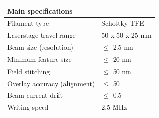 \documentclass{article}
\begin{document}

\begin{table}[]
\centering
    \begin{tabular}{|ll|}
    \hline
    \multicolumn{2}{|l|}{Main specifications}                            \\ \hline
    \multicolumn{1}{|l|}{Filament type}                & Schottky-TFE    \\ \hline
    \multicolumn{1}{|l|}{Laserstage travel range}      & 50 x 50 x 25 mm \\ \hline
    \multicolumn{1}{|l|}{Beam size (resolution)}       & $\leq$ 2.5 nm   \\ \hline
    \multicolumn{1}{|l|}{Minimum feature size}         & $\leq$ 20 nm           \\ \hline
    \multicolumn{1}{|l|}{Field stitching}              & $\leq$ 50 nm           \\ \hline
    \multicolumn{1}{|l|}{Overlay accuracy (alignment)} & $\leq$ 50              \\ \hline
    \multicolumn{1}{|l|}{Beam current drift}           & $\leq$ 0.5             \\ \hline
    \multicolumn{1}{|l|}{Writing speed}                & 2.5 MHz         \\ \hline
    \end{tabular}
    \end{table}
\end{document}
